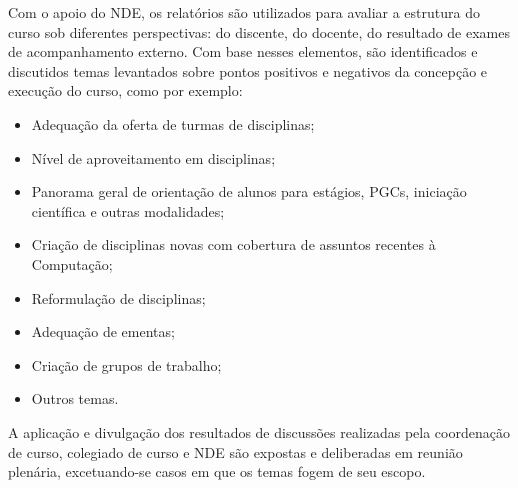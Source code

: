 Com o apoio do NDE, os relatórios são utilizados para avaliar a estrutura do curso sob diferentes perspectivas: do discente, do docente, do resultado de exames de acompanhamento externo. Com base nesses elementos, são identificados e discutidos temas levantados sobre pontos positivos e negativos da concepção e execução do curso, como por exemplo:
\begin{itemize}
	\item Adequação da oferta de turmas de disciplinas;
	\item Nível de aproveitamento em disciplinas;
	\item Panorama geral de orientação de alunos para estágios, PGCs, iniciação científica e outras modalidades;
	\item Criação de disciplinas novas com cobertura de assuntos recentes à Computação;
	\item Reformulação de disciplinas;
	\item Adequação de ementas;
	\item Criação de grupos de trabalho;
	\item Outros temas.
\end{itemize}

A aplicação e divulgação dos resultados de discussões realizadas pela coordenação de curso, colegiado de curso e NDE são expostas e deliberadas em reunião plenária, excetuando-se casos em que os temas fogem de seu escopo.
